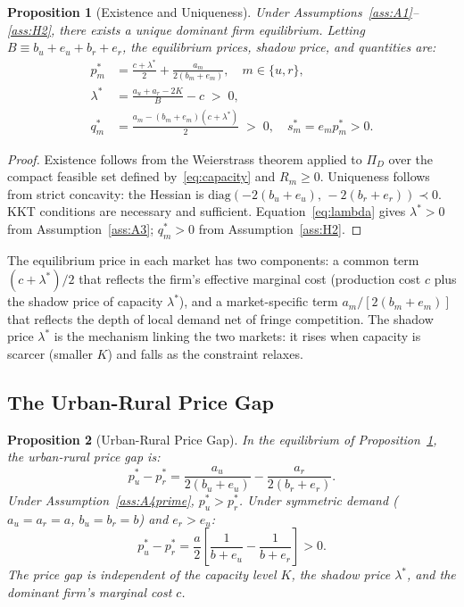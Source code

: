 \documentclass[12pt]{article}
\theoremstyle{plain}
\newtheorem{proposition}{Proposition}
\theoremstyle{definition}
\theoremstyle{remark}
\begin{document}
\begin{proposition}[Existence and Uniqueness]
\label{prop:existence}
Under Assumptions~\ref{ass:A1}--\ref{ass:H2}, there exists a unique dominant firm
equilibrium.  Letting $B \equiv b_u + e_u + b_r + e_r$, the equilibrium prices,
shadow price, and quantities are:
\begin{align}
  p_m^* &= \frac{c + \lambda^*}{2} + \frac{a_m}{2(b_m + e_m)}, \quad m \in \{u,r\}, \\
  \lambda^* &= \frac{a_u + a_r - 2K}{B} - c \;>\; 0, \\
  q_m^* &= \frac{a_m - (b_m + e_m)(c + \lambda^*)}{2} \;>\; 0, \quad
  s_m^* = e_m p_m^* > 0.
\end{align}
\end{proposition}

\begin{proof}
Existence follows from the Weierstrass theorem applied to $\Pi_D$ over the compact
feasible set defined by~\eqref{eq:capacity} and $R_m \geq 0$.  Uniqueness follows
from strict concavity: the Hessian is $\mathrm{diag}(-2(b_u+e_u),\,-2(b_r+e_r)) \prec 0$.
KKT conditions are necessary and sufficient.  Equation~\eqref{eq:lambda} gives
$\lambda^* > 0$ from Assumption~\ref{ass:A3}; $q_m^* > 0$ from Assumption~\ref{ass:H2}.
\end{proof}

The equilibrium price in each market has two components: a common term
$(c + \lambda^*)/2$ that reflects the firm's effective marginal cost (production
cost $c$ plus the shadow price of capacity $\lambda^*$), and a market-specific
term $a_m/[2(b_m + e_m)]$ that reflects the depth of local demand net of fringe
competition.  The shadow price $\lambda^*$ is the mechanism linking the two
markets: it rises when capacity is scarcer (smaller $K$) and falls as the
constraint relaxes.

\subsection{The Urban-Rural Price Gap}

\begin{proposition}[Urban-Rural Price Gap]
\label{prop:pricegap}
In the equilibrium of Proposition~\ref{prop:existence}, the urban-rural price
gap is:
\begin{equation}
  p_u^* - p_r^* = \frac{a_u}{2(b_u + e_u)} - \frac{a_r}{2(b_r + e_r)}.
  \label{eq:gap}
\end{equation}
Under Assumption~\ref{ass:A4prime}, $p_u^* > p_r^*$.  Under symmetric demand
($a_u = a_r = a$, $b_u = b_r = b$) and $e_r > e_u$:
\begin{equation}
  p_u^* - p_r^* = \frac{a}{2}\left[\frac{1}{b+e_u} - \frac{1}{b+e_r}\right] > 0.
  \label{eq:gap-symmetric}
\end{equation}
The price gap is independent of the capacity level $K$, the shadow price
$\lambda^*$, and the dominant firm's marginal cost $c$.
\end{proposition}
\end{document}
